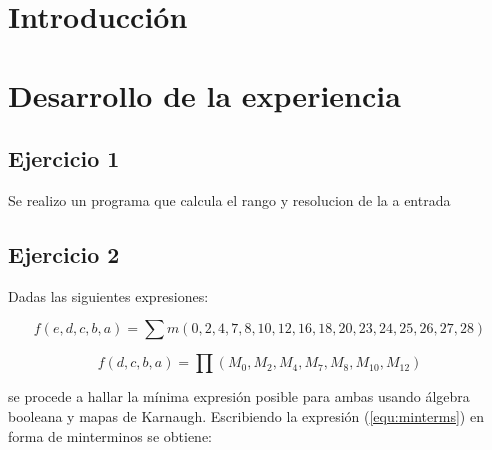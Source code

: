 \documentclass[a4paper]{article}
\begin{document}




\section*{Introducción}


\section*{Desarrollo de la experiencia}

\subsection*{Ejercicio 1}
Se realizo un programa que calcula el rango y resolucion de la a entrada
\subsection*{Ejercicio 2}

Dadas las siguientes expresiones:

\begin{equation}
f \left( e,d,c,b,a \right) = \sum m \left( 0,2,4,7,8,10,12,16,18,20,23,24,25,26,27,28 \right)
\label{equ:minterms}
\end{equation}

\begin{equation}
f \left( d,c,b,a \right) = \prod \left( M_0,M_2,M_4,M_7,M_8,M_{10},M_{12} \right)
\label{equ:maxterms}
\end{equation}

se procede a hallar la mínima expresión posible para ambas usando álgebra booleana y mapas de Karnaugh.
Escribiendo la expresión (\ref{equ:minterms}) en forma de minterminos se obtiene:
\end{document}
